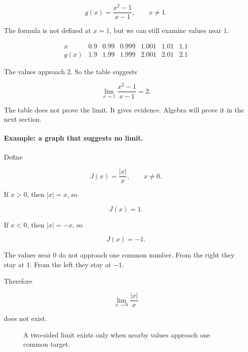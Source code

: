 \[
g(x)=\frac{x^2-1}{x-1},
\qquad x\neq1.
\]

The formula is not defined at \(x=1\), but we can still examine values near \(1\).

\[
\begin{array}{c|cccccc}
x & 0.9 & 0.99 & 0.999 & 1.001 & 1.01 & 1.1 \\ \hline
g(x) & 1.9 & 1.99 & 1.999 & 2.001 & 2.01 & 2.1
\end{array}
\]

The values approach \(2\).  So the table suggests

\[
\lim_{x\to1}\frac{x^2-1}{x-1}=2.
\]

The table does not prove the limit.  It gives evidence.  Algebra will prove it in the next section.

\paragraph{Example: a graph that suggests no limit.}
Define

\[
J(x)=\frac{|x|}{x},
\qquad x\neq0.
\]

If \(x>0\), then \(|x|=x\), so

\[
J(x)=1.
\]

If \(x<0\), then \(|x|=-x\), so

\[
J(x)=-1.
\]

The values near \(0\) do not approach one common number.  From the right they stay at \(1\).  From the left they stay at \(-1\).

Therefore

\[
\lim_{x\to0}\frac{|x|}{x}
\]

does not exist.

\begin{figure}[h]
\centering
{}
\caption{A two-sided limit exists only when nearby values approach one common target.}
\label{fig:jump-no-limit}
\end{figure}


